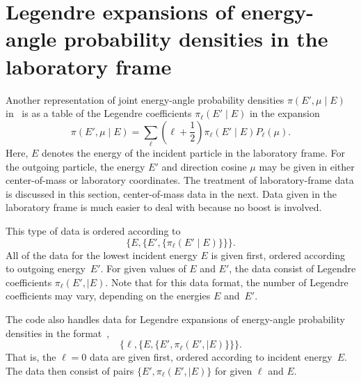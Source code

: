 \chapter{Legendre expansions of energy-angle probability densities
in the laboratory frame}
\label{Sec:Legendre-lab}
Another representation of joint energy-angle probability densities
$\pi(E', \mu \mid E)$ in \xendl\ is as a table of the Legendre 
coefficients $\pi_\ell(E' \mid E)$ in the expansion
\begin{equation}
  \pi( E', \mu \mid E) = \sum_\ell
  \left(
    \ell + \frac{1}{2}
  \right)
  \pi_\ell( E' \mid E) P_\ell( \mu ).
 \label{piLegendre}
\end{equation}
Here, $E$ denotes the energy of the incident particle in the
laboratory frame.  For the outgoing particle, the energy $E'$ and 
direction cosine $\mu$ may be given in either center-of-mass or laboratory
coordinates.  The treatment of laboratory-frame data is discussed in this section, 
center-of-mass data in the next.  Data given in the laboratory frame is
much easier to deal with because no boost is involved.

This type of data is ordered according to
\begin{equation}
\{ E, \{ E', \{ \pi_\ell(E' \mid E) \} \} \}.
 \label{ENDF-I4}
\end{equation}
All of the data for the lowest incident energy $E$
is given first, ordered according to outgoing energy~$E'$.  For
given values of $E$ and $E'$, the data consist of Legendre coefficients
$\pi_\ell(E', \mid E)$.  Note that for this data format, the number
of Legendre coefficients may vary, depending on the energies $E$ and~$E'$.

The {\gettransfer} code also handles data for Legendre expansions of
energy-angle probability densities in the {\ENDL} format~\cite{Omega},
\begin{equation}
\{ \ell, \{ E, \{ E', \pi_\ell(E', \mid E) \} \} \}.
 \label{ENDL-I4}
\end{equation}
That is, the $\ell = 0$ data are given first, ordered according to
incident energy~$E$.  The data then consist of pairs
$\{ E', \pi_\ell(E', \mid E) \}$ for given $\ell$ and $E$.

